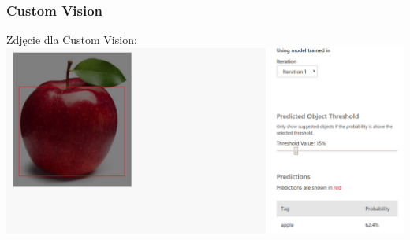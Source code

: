 \documentclass[11pt]{article}
\begin{document}
    \hypertarget{custom-vision}{%
\subsubsection{Custom Vision}\label{custom-vision}}

Zdjęcie dla Custom Vision: \newline
\includegraphics{image_report/apple_89.png}
\end{document}
